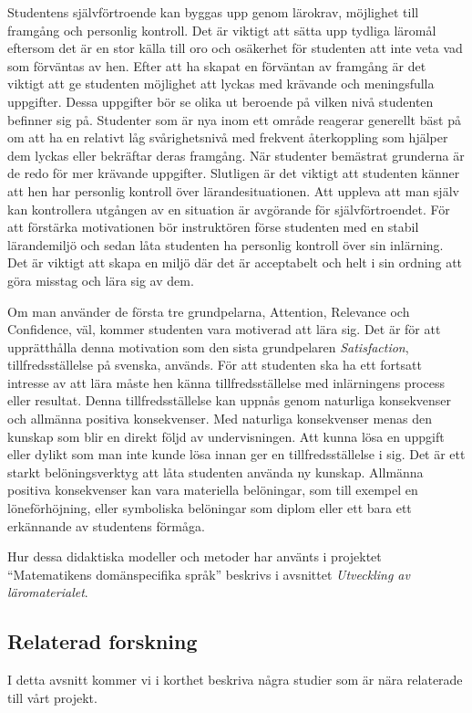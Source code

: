 \documentclass[12pt,a4paper,twoside,openright]{article}
\begin{document}
Studentens självförtroende kan byggas upp genom lärokrav, möjlighet
till fram\-gång och personlig kontroll. Det är viktigt att sätta upp
tydliga läromål eftersom det är en stor källa till oro och osäkerhet
för studenten att inte veta vad som förväntas av hen. Efter att ha
skapat en förväntan av framgång är det viktigt att ge studenten
möjlighet att lyckas med krävande och meningsfulla uppgifter. Dessa
uppgifter bör se olika ut beroende på vilken nivå studenten befinner
sig på. Studenter som är nya inom ett område reagerar generellt bäst
på om att ha en relativt låg svårighetsnivå med frekvent återkoppling
som hjälper dem lyckas eller bekräftar deras framgång. När studenter
bemästrat grunderna är de redo för mer krävande uppgifter.
Slutligen är det viktigt att studenten känner att hen har personlig
kontroll över lärandesituationen. Att uppleva att man själv kan
kontrollera utgången av en situation är avgörande för självförtroendet.
För att förstärka motivationen bör instruktören förse studenten med en
stabil lärandemiljö och sedan låta studenten ha personlig kontroll över sin
inlärning. Det är viktigt att skapa en miljö där det är acceptabelt och helt
i sin ordning att göra misstag och lära sig av dem.

Om man använder de första tre grundpelarna, Attention, Relevance och
Confidence, väl, kommer studenten vara motiverad att lära sig. Det är
för att upprätthålla denna motivation som den sista grundpelaren
\textit{Satisfaction}, tillfredsställelse på svenska, används. För
att studenten ska ha ett fortsatt intresse av att lära måste hen känna
tillfredsställelse med inlärningens process eller resultat. Denna
tillfredsställelse kan uppnås genom naturliga konsekvenser och
allmänna positiva konsekvenser. Med naturliga konsekvenser menas den
kunskap som blir en direkt följd av undervisningen. Att kunna lösa en
uppgift eller dylikt som man inte kunde lösa innan ger en
tillfredsställelse i sig. Det är ett starkt belöningsverktyg att låta
studenten använda ny kunskap. Allmänna positiva konsekvenser kan vara
materiella belöningar, som till exempel en löneförhöjning, eller
symboliska belöningar som diplom eller ett bara ett erkännande av
studentens förmåga.

Hur dessa didaktiska modeller och metoder har använts i projektet
``Matematikens domänspecifika språk'' beskrivs i avsnittet
\textit{Utveckling av läromaterialet}.

\subsection{Relaterad forskning}
\label{sec:relForsk}
I detta avsnitt kommer vi i korthet beskriva några studier som
är nära relaterade till vårt projekt.
\end{document}
